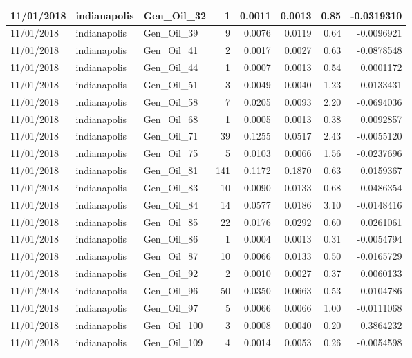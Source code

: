 \documentclass[
  letterpaper,
  DIV=11,
  numbers=noendperiod]{scrartcl}
\begin{document}
\begin{tabular}{l|l|l|r|r|r|r|r}
\hline
11/01/2018 & indianapolis & Gen\_Oil\_32 & 1 & 0.0011 & 0.0013 & 0.85 & -0.0319310\\
\hline
11/01/2018 & indianapolis & Gen\_Oil\_39 & 9 & 0.0076 & 0.0119 & 0.64 & -0.0096921\\
\hline
11/01/2018 & indianapolis & Gen\_Oil\_41 & 2 & 0.0017 & 0.0027 & 0.63 & -0.0878548\\
\hline
11/01/2018 & indianapolis & Gen\_Oil\_44 & 1 & 0.0007 & 0.0013 & 0.54 & 0.0001172\\
\hline
11/01/2018 & indianapolis & Gen\_Oil\_51 & 3 & 0.0049 & 0.0040 & 1.23 & -0.0133431\\
\hline
11/01/2018 & indianapolis & Gen\_Oil\_58 & 7 & 0.0205 & 0.0093 & 2.20 & -0.0694036\\
\hline
11/01/2018 & indianapolis & Gen\_Oil\_68 & 1 & 0.0005 & 0.0013 & 0.38 & 0.0092857\\
\hline
11/01/2018 & indianapolis & Gen\_Oil\_71 & 39 & 0.1255 & 0.0517 & 2.43 & -0.0055120\\
\hline
11/01/2018 & indianapolis & Gen\_Oil\_75 & 5 & 0.0103 & 0.0066 & 1.56 & -0.0237696\\
\hline
11/01/2018 & indianapolis & Gen\_Oil\_81 & 141 & 0.1172 & 0.1870 & 0.63 & 0.0159367\\
\hline
11/01/2018 & indianapolis & Gen\_Oil\_83 & 10 & 0.0090 & 0.0133 & 0.68 & -0.0486354\\
\hline
11/01/2018 & indianapolis & Gen\_Oil\_84 & 14 & 0.0577 & 0.0186 & 3.10 & -0.0148416\\
\hline
11/01/2018 & indianapolis & Gen\_Oil\_85 & 22 & 0.0176 & 0.0292 & 0.60 & 0.0261061\\
\hline
11/01/2018 & indianapolis & Gen\_Oil\_86 & 1 & 0.0004 & 0.0013 & 0.31 & -0.0054794\\
\hline
11/01/2018 & indianapolis & Gen\_Oil\_87 & 10 & 0.0066 & 0.0133 & 0.50 & -0.0165729\\
\hline
11/01/2018 & indianapolis & Gen\_Oil\_92 & 2 & 0.0010 & 0.0027 & 0.37 & 0.0060133\\
\hline
11/01/2018 & indianapolis & Gen\_Oil\_96 & 50 & 0.0350 & 0.0663 & 0.53 & 0.0104786\\
\hline
11/01/2018 & indianapolis & Gen\_Oil\_97 & 5 & 0.0066 & 0.0066 & 1.00 & -0.0111068\\
\hline
11/01/2018 & indianapolis & Gen\_Oil\_100 & 3 & 0.0008 & 0.0040 & 0.20 & 0.3864232\\
\hline
11/01/2018 & indianapolis & Gen\_Oil\_109 & 4 & 0.0014 & 0.0053 & 0.26 & -0.0054598\\

\end{tabular}
\end{document}
